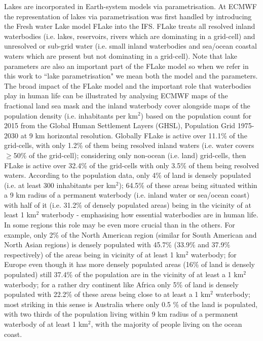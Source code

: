 \documentclass[twocolumn]{article}
\begin{document}
\noindent Lakes are incorporated in Earth-system models via parametrisation. At ECMWF the  representation of lakes via parametrisation was first handled by introducing the Fresh water Lake model FLake\cite{Mironov2008} into the IFS. FLake treats all resolved inland waterbodies (i.e. lakes, reservoirs, rivers which are dominating in a grid-cell) and unresolved or sub-grid water (i.e. small inland waterbodies and sea/ocean coastal waters which are present but not dominating in a grid-cell). Note that lake parameters are also an important part of the FLake model so when we refer in this work to ``lake parametrisation" we mean both the model and the parameters. The broad impact of the FLake model and the important role that waterbodies play in human life can be illustrated by analysing ECMWF maps of the fractional land sea mask and the inland waterbody cover alongside maps of the population density (i.e. inhabitants per km$^2$) based on the population count for 2015 from the Global Human Settlement Layers (GHSL), Population Grid 1975-2030\cite{GHS,JRC100523} at 9 km horizontal resolution. Globally FLake is active over 11.1\% of the grid-cells, with only 1.2\% of them being resolved inland waters (i.e. water covers $\geq$50\% of the grid-cell); considering only non-ocean (i.e. land) grid-cells, then FLake is active over 32.4\% of the grid-cells with only 3.5\% of them being resolved waters. According to the population data, only 4\% of land is densely populated (i.e. at least 300 inhabitants per km$^2$); 64.5\% of these areas being situated within a 9 km radius of a permanent waterbody (i.e. inland water or sea/ocean coast) with half of it (i.e. 31.2\% of densely populated areas) being in the vicinity of at least 1 km$^2$ waterbody - emphasising how essential waterbodies are in human life. In some regions this role may be even more crucial than in the others. For example, only 2\% of the North American region (similar for South American and North Asian regions) is densely populated with 45.7\% (33.9\% and 37.9\% respectively) of the areas being in vicinity of at least 1 km$^2$ waterbody; for Europe even though it has more densely populated areas (16\% of land is densely populated) still 37.4\% of the population are in the vicinity of at least a 1 km$^2$ waterbody; for a rather dry continent like Africa only 5\% of land is densely populated with 22.2\% of these areas being close to at least a 1 km$^2$ waterbody; most striking in this sense is Australia where only 0.5 \% of the land is populated, with two thirds of the population living within 9 km radius of a permanent waterbody of at least 1 km$^2$, with the majority of people living on the ocean coast. \newline 
\end{document}
